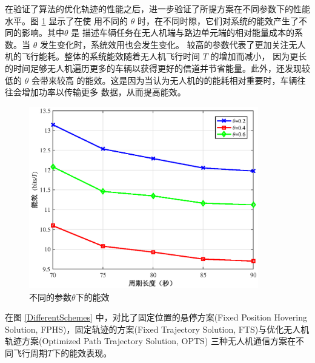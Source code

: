 在验证了算法的优化轨迹的性能之后，进一步验证了所提方案在不同参数下的性能水平。图 \ref{diffthet} 显示了在使
用不同的 $\theta$ 时，在不同时隙，它们对系统的能效产生了不同的影响。其中$\theta$ 是
描述车辆任务在无人机端与路边单元端的相对能量成本的系数。当 $\theta$ 发生变化时，系统效用也会发生变化。
较高的参数代表了更加关注无人机的飞行能耗。整体的系统能效随着无人机飞行时间 $T$ 的增加而减小，
因为更长的时间足够无人机遍历更多的车辆以获得更好的信道并节省能量。此外，还发现较低的 $\theta$ 会带来较高
的能效。这是因为当认为无人机的的能耗相对重要时，车辆往往会增加功率以传输更多
数据，从而提高能效。
\begin{figure}[H]
\centering
\includegraphics[width=10cm]{figures//chap4//不同的参数theta下的能效.eps}
\caption{不同的参数$\theta$下的能效}
\label{diffthet}
\end{figure}

在图 \ref{DifferentSchemes} 中，对比了固定位置的悬停方案(Fixed Position Hovering Solution, FPHS)，固定轨迹的方案(Fixed Trajectory Solution, FTS)与优化无人机轨迹方案(Optimized Path Trajectory Solution, OPTS)
三种无人机通信方案在不同飞行周期$T$下的能效表现。


